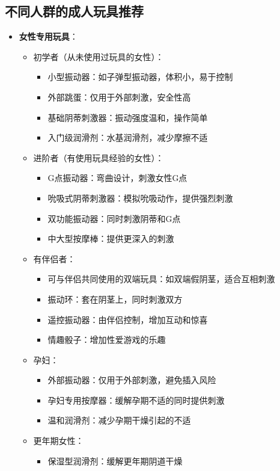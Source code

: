 \documentclass[12pt,UTF8]{ctexbook}
\begin{document}
\subsection{不同人群的成人玩具推荐}

\begin{itemize}
	\item \textbf{女性专用玩具}：
	\begin{itemize}
		\item 初学者（从未使用过玩具的女性）：
		\begin{itemize}
			\item 小型振动器：如子弹型振动器，体积小，易于控制
			\item 外部跳蛋：仅用于外部刺激，安全性高
			\item 基础阴蒂刺激器：振动强度温和，操作简单
			\item 入门级润滑剂：水基润滑剂，减少摩擦不适
		\end{itemize}
		\item 进阶者（有使用玩具经验的女性）：
		\begin{itemize}
			\item G点振动器：弯曲设计，刺激女性G点
			\item 吮吸式阴蒂刺激器：模拟吮吸动作，提供强烈刺激
			\item 双功能振动器：同时刺激阴蒂和G点
			\item 中大型按摩棒：提供更深入的刺激
		\end{itemize}
		\item 有伴侣者：
		\begin{itemize}
			\item 可与伴侣共同使用的双端玩具：如双端假阴茎，适合互相刺激
			\item 振动环：套在阴茎上，同时刺激双方
			\item 遥控振动器：由伴侣控制，增加互动和惊喜
			\item 情趣骰子：增加性爱游戏的乐趣
		\end{itemize}
		\item 孕妇：
		\begin{itemize}
			\item 外部振动器：仅用于外部刺激，避免插入风险
			\item 孕妇专用按摩器：缓解孕期不适的同时提供刺激
			\item 温和润滑剂：减少孕期干燥引起的不适
		\end{itemize}
		\item 更年期女性：
		\begin{itemize}
			\item 保湿型润滑剂：缓解更年期阴道干燥

\end{itemize}
\end{itemize}
\end{itemize}
\end{document}
